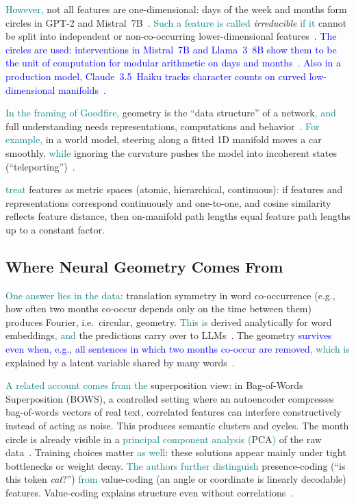 \documentclass[11pt,a4paper]{article}
\newcommand{\fromextra}[1]{\textcolor{blue}{#1}}
\newcommand{\fromclaude}[1]{\textcolor{orange!85!black}{#1}}
\newcommand{\fromprose}[1]{\textcolor{teal}{#1}}
\newcommand{\fromextra}[1]{#1}
\newcommand{\fromclaude}[1]{#1}
\newcommand{\fromprose}[1]{#1}
\begin{document}
\fromprose{However,} not all features are one-dimensional: days of the week and months form circles in GPT-2 and Mistral~7B~\cite{engels2025notall}.
\fromprose{Such a feature is called} \emph{irreducible} \fromprose{if it} cannot be split into independent or non-co-occurring lower-dimensional features~\cite{engels2025notall}.
\fromextra{The circles are used: interventions in Mistral~7B and Llama~3~8B show them to be the unit of computation for modular arithmetic on days and months~\cite{engels2025notall}.}
\fromextra{Also in a production model, Claude~3.5~Haiku tracks character counts on curved low-dimensional manifolds~\cite{gurnee2025manifolds}.}

\fromprose{In the framing of Goodfire,} geometry is the \enquote{data structure} of a network\fromprose{, and} full understanding needs representations, computations and behavior~\cite{goodfire2026world}.
\fromprose{For example,} in a world model, steering along a fitted 1D manifold moves a car smoothly\fromprose{, while} ignoring the curvature pushes the model into incoherent states (\enquote{teleporting})~\cite{goodfire2026world}.

\fromprose{\textcite{modell2025origins} treat} features as metric spaces (atomic, hierarchical, continuous)\fromprose{:} if features and representations correspond continuously and one-to-one, and cosine similarity reflects feature distance, then on-manifold path lengths equal feature path lengths up to a constant factor.

\subsection{Where Neural Geometry Comes From}\label{sec:origins}
\fromprose{One answer lies in the data:} translation symmetry in word co-occurrence (e.g., how often two months co-occur depends only on the time between them) produces Fourier, i.e.\ circular, geometry. \fromprose{This is} derived analytically for word embeddings\fromprose{, and} the predictions carry over to LLMs~\cite{karkada2026symmetry}.
The geometry \fromextra{survives even when, e.g., all sentences in which two months co-occur are removed}\fromprose{, which is} explained by a latent variable shared by many words~\cite{karkada2026symmetry}.

\fromprose{A related account comes from the} superposition view: in \fromclaude{Bag-of-Words Superposition (BOWS), a controlled setting where an autoencoder compresses bag-of-words vectors of real text,} correlated features can interfere constructively instead of acting as noise. This produces semantic clusters and cycles. The month circle is already visible in a \fromprose{principal component analysis (}PCA\fromprose{)} of the raw data~\cite{prieto2026correlations}.
Training choices matter \fromprose{as well}: these solutions appear mainly under tight bottlenecks or weight decay. \fromprose{The authors further distinguish} presence-coding (\enquote{is this token \emph{cat}?}) \fromprose{from} value-coding (an angle or coordinate is linearly decodable) features. Value-coding explains structure even without correlations~\cite{prieto2026correlations}.
\end{document}
